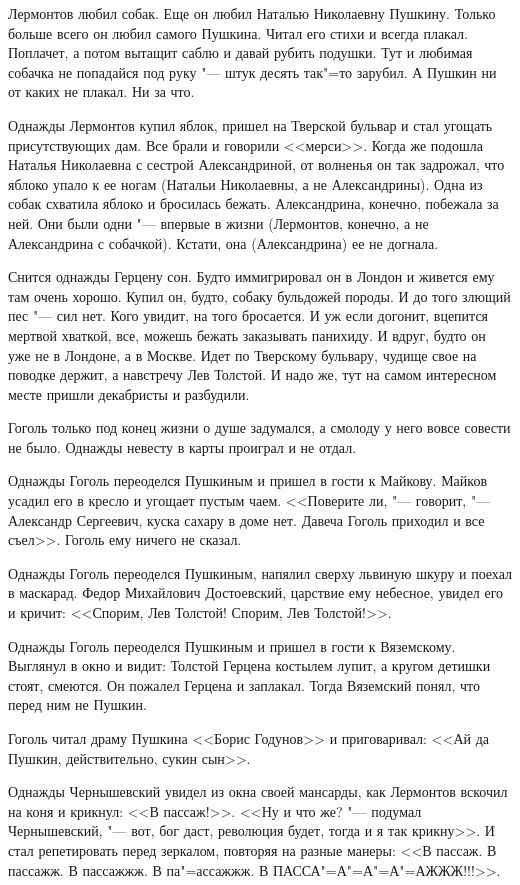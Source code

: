 Лермонтов любил собак. Еще он любил Наталью Николаевну Пушкину. Только больше 
всего он любил самого Пушкина. Читал его стихи и всегда плакал. Поплачет, а 
потом вытащит саблю и давай рубить подушки. Тут и любимая собачка не попадайся 
под руку "--- штук десять так"=то зарубил. А Пушкин ни от каких не плакал. Ни
за что.

Однажды Лермонтов купил яблок, пришел на Тверской бульвар и стал угощать 
присутствующих дам. Все брали и говорили <<мерси>>. Когда же подошла Наталья 
Николаевна с сестрой Александриной, от волненья он так задрожал, что яблоко 
упало к ее ногам (Натальи Николаевны, а не Александрины). Одна из собак схватила
яблоко и бросилась бежать. Александрина, конечно, побежала за ней. Они были одни
"--- впервые в жизни (Лермонтов, конечно, а не Александрина с собачкой). Кстати,
она (Александрина) ее не догнала.

Снится однажды Герцену сон. Будто иммигрировал он в Лондон и живется ему там 
очень хорошо. Купил он, будто, собаку бульдожей породы. И до того злющий
пес "--- сил нет. Кого увидит, на того бросается. И уж если догонит, вцепится 
мертвой хваткой, все, можешь бежать заказывать панихиду. И вдруг, будто он уже
не в Лондоне, а в Москве. Идет по Тверскому бульвару, чудище свое на поводке 
держит, а навстречу Лев Толстой. И надо же, тут на самом интересном месте пришли
декабристы и разбудили.

Гоголь только под конец жизни о душе задумался, а смолоду у него вовсе совести 
не было. Однажды невесту в карты проиграл и не отдал.

Однажды Гоголь переоделся Пушкиным и пришел в гости к Майкову. Майков усадил его
в кресло и угощает пустым чаем. <<Поверите ли, "--- говорит, "--- Александр 
Сергеевич, куска сахару в доме нет. Давеча Гоголь приходил и все съел>>. Гоголь 
ему ничего не сказал.

Однажды Гоголь переоделся Пушкиным, напялил сверху львиную шкуру и поехал в 
маскарад. Федор Михайлович Достоевский, царствие ему небесное, увидел его и 
кричит: <<Спорим, Лев Толстой! Спорим, Лев Толстой!>>.

Однажды Гоголь переоделся Пушкиным и пришел в гости к Вяземскому. Выглянул в 
окно и видит: Толстой Герцена костылем лупит, а кругом детишки стоят, смеются. 
Он пожалел Герцена и заплакал. Тогда Вяземский понял, что перед ним не Пушкин.

Гоголь читал драму Пушкина <<Борис Годунов>> и приговаривал: <<Ай да Пушкин, 
действительно, сукин сын>>.

Однажды Чернышевский увидел из окна своей мансарды, как Лермонтов вскочил на 
коня и крикнул: <<В пассаж!>>. <<Ну и что же? "--- подумал Чернышевский, "--- 
вот, бог даст, революция будет, тогда и я так крикну>>. И стал репетировать 
перед зеркалом, повторяя на разные манеры: <<В пассаж. В пассажж. В пассажжж. В 
па"=а­ссажжж. В ПАССА"=А"=А"=А"=АЖЖЖ!!!>>.